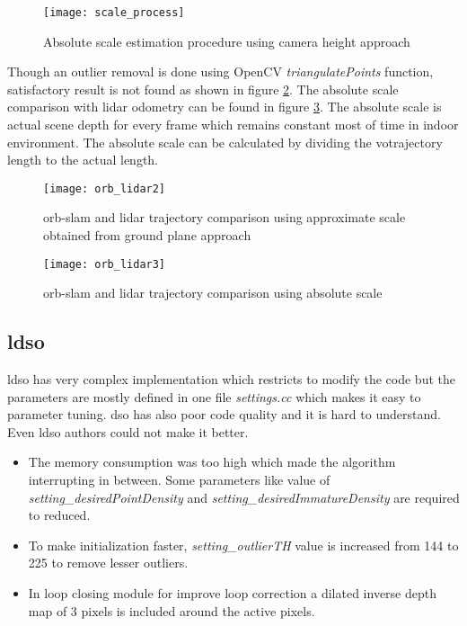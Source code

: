 \begin{figure}[H]
	\centering
	\texttt{[image: scale\_process]}
	\caption{Absolute scale estimation procedure using camera height approach \cite{ground}}
	\label{fig:scale_process}
\end{figure}
\noindent Though an outlier removal is done using OpenCV \textit{triangulatePoints} function, satisfactory result is not found as shown in figure \ref{fig:orb_lidar2}. The absolute scale comparison with \acrshort{lidar} odometry can be found in figure \ref{fig:orb_lidar3}. The absolute scale is actual scene depth for every frame which remains constant most of time in indoor environment. The absolute scale can be calculated by dividing the \acrshort{vo}trajectory length to the actual length. 
\begin{figure}[H]
	\centering
	\texttt{[image: orb\_lidar2]}
	\caption{\acrshort{orb}-\acrshort{slam} and \acrshort{lidar} trajectory comparison using approximate scale obtained from ground plane approach}
	\label{fig:orb_lidar2}
\end{figure}

\begin{figure}[H]
	\centering
	\texttt{[image: orb\_lidar3]}
	\caption{\acrshort{orb}-\acrshort{slam} and \acrshort{lidar} trajectory comparison using absolute scale}
	\label{fig:orb_lidar3}
\end{figure}

\subsection{\acrshort{ldso}}
\acrshort{ldso} has very complex implementation which restricts to modify the code but the parameters are mostly defined in one file \textit{settings.cc} which makes it easy to parameter tuning. \acrshort{dso} has also poor code quality and it is hard to understand. Even \acrshort{ldso} authors could not make it better. 
\begin{itemize} 
	\item The memory consumption was too high which made the algorithm interrupting in between. Some parameters like value of \textit{setting\_desiredPointDensity} and \textit{setting\_desiredImmatureDensity} are required to reduced.
 	\item To make initialization faster, \textit{setting\_outlierTH} value is increased from 144 to 225 to remove lesser outliers.
	\item In loop closing module for improve loop correction a dilated inverse depth map of 3 pixels is included around the active pixels. 
\end{itemize}